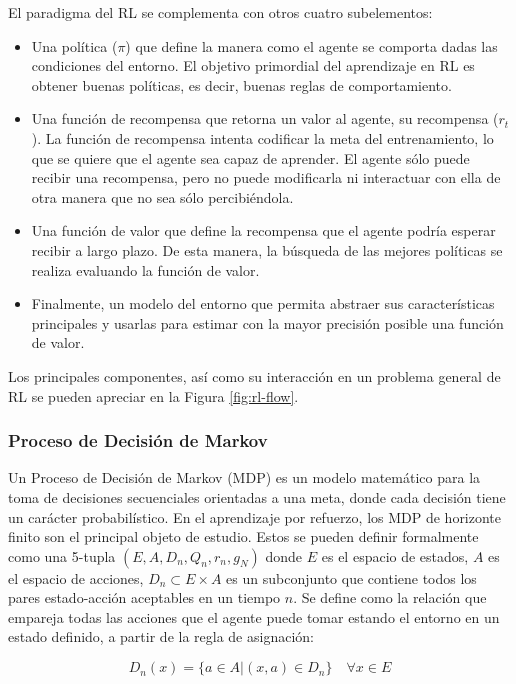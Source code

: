 El paradigma del RL se complementa con otros cuatro subelementos: 

\begin{itemize}
	\item Una política ($\pi$) que define la manera como el agente se comporta dadas las condiciones del entorno. El objetivo primordial del aprendizaje en RL es obtener buenas políticas, es decir, buenas reglas de comportamiento.
	\item Una función de recompensa que retorna un valor al agente, su recompensa ($r_t$). La función de recompensa intenta codificar la meta del entrenamiento, lo que se quiere que el agente sea capaz de aprender. El agente sólo puede recibir una recompensa, pero no puede modificarla ni interactuar con ella de otra manera que no sea sólo percibiéndola.
	\item Una función de valor que define la recompensa que el agente podría esperar recibir a largo plazo. De esta manera, la búsqueda de las mejores políticas se realiza evaluando la función de valor.
	\item Finalmente, un modelo del entorno que permita abstraer sus características principales y usarlas para estimar con la mayor precisión posible una función de valor. \parencite{sutton2018reinforcement}
\end{itemize} 

Los principales componentes, así como su interacción en un problema general de RL se pueden apreciar en la Figura \ref{fig:rl-flow}.\\


\subsubsection{Proceso de Decisión de Markov}
Un Proceso de Decisión de Markov (MDP) es un modelo matemático para la toma de decisiones secuenciales orientadas a una meta, donde cada decisión tiene un carácter probabilístico. En el aprendizaje por refuerzo, los MDP de horizonte finito son el principal objeto de estudio. Estos se pueden definir formalmente como una 5-tupla $(E, A, D_n, Q_n, r_n, g_N)$ donde $E$ es el espacio de estados, $A$ es el espacio de acciones, $D_n \subset E \times A$ es un subconjunto que contiene todos los pares estado-acción aceptables en un tiempo $n$. Se define como la relación que empareja todas las acciones que el agente puede tomar estando el entorno en un estado definido, a partir de la regla de asignación:

\begin{equation}
	D_n(x) = \{a \in A | (x,a) \in D_n\} \quad \forall x \in E
\end{equation}

